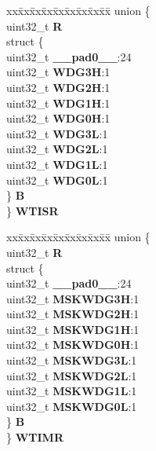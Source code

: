 \begin{DoxyCompactItemize}
\begin{tabbing}
\end{tabbing}\item 
\mbox{\label{structADC__tag_aed5effbff695f8f686fc75dcb628d72e}} 
\begin{tabbing}
xx\=xx\=xx\=xx\=xx\=xx\=xx\=xx\=xx\=\kill
union \{\\
\>uint32\_t {\bfseries R}\\
\>struct \{\\
\>\>uint32\_t {\bfseries \_\_pad0\_\_}:24\\
\>\>uint32\_t {\bfseries WDG3H}:1\\
\>\>uint32\_t {\bfseries WDG2H}:1\\
\>\>uint32\_t {\bfseries WDG1H}:1\\
\>\>uint32\_t {\bfseries WDG0H}:1\\
\>\>uint32\_t {\bfseries WDG3L}:1\\
\>\>uint32\_t {\bfseries WDG2L}:1\\
\>\>uint32\_t {\bfseries WDG1L}:1\\
\>\>uint32\_t {\bfseries WDG0L}:1\\
\>\} {\bfseries B}\\
\} {\bfseries WTISR}\\

\end{tabbing}\item 
\mbox{\label{structADC__tag_a90d52c526c64721c944d1b2b4721b53d}} 
\begin{tabbing}
xx\=xx\=xx\=xx\=xx\=xx\=xx\=xx\=xx\=\kill
union \{\\
\>uint32\_t {\bfseries R}\\
\>struct \{\\
\>\>uint32\_t {\bfseries \_\_pad0\_\_}:24\\
\>\>uint32\_t {\bfseries MSKWDG3H}:1\\
\>\>uint32\_t {\bfseries MSKWDG2H}:1\\
\>\>uint32\_t {\bfseries MSKWDG1H}:1\\
\>\>uint32\_t {\bfseries MSKWDG0H}:1\\
\>\>uint32\_t {\bfseries MSKWDG3L}:1\\
\>\>uint32\_t {\bfseries MSKWDG2L}:1\\
\>\>uint32\_t {\bfseries MSKWDG1L}:1\\
\>\>uint32\_t {\bfseries MSKWDG0L}:1\\
\>\} {\bfseries B}\\
\} {\bfseries WTIMR}\\


\end{tabbing}
\end{DoxyCompactItemize}
